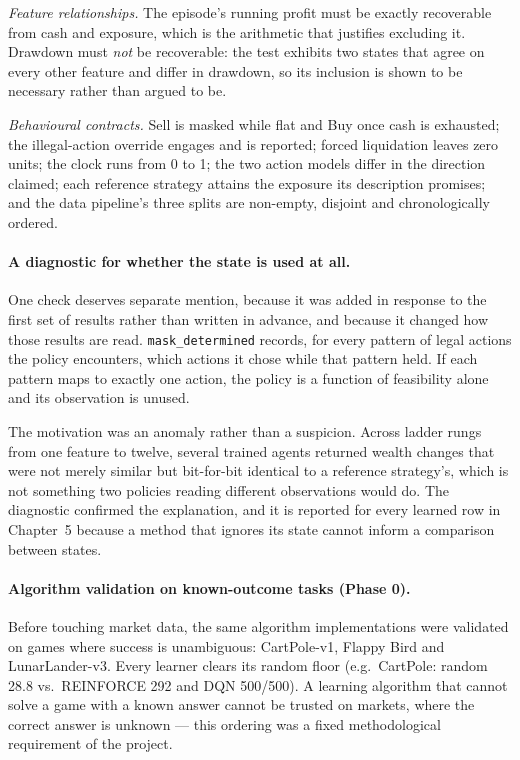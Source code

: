 \emph{Feature relationships.} The episode's running profit must be exactly
recoverable from cash and exposure, which is the arithmetic that justifies
excluding it. Drawdown must \emph{not} be recoverable: the test exhibits two
states that agree on every other feature and differ in drawdown, so its
inclusion is shown to be necessary rather than argued to be.

\emph{Behavioural contracts.} Sell is masked while flat and Buy once cash is
exhausted; the illegal-action override engages and is reported; forced
liquidation leaves zero units; the clock runs from 0 to 1; the two action
models differ in the direction claimed; each reference strategy attains the
exposure its description promises; and the data pipeline's three splits are
non-empty, disjoint and chronologically ordered.

\paragraph{A diagnostic for whether the state is used at all.} One check
deserves separate mention, because it was added in response to the first
set of results rather than written in advance, and because it changed how
those results are read. \texttt{mask\_determined} records, for every pattern
of legal actions the policy encounters, which actions it chose while that
pattern held. If each pattern maps to exactly one action, the policy is a
function of feasibility alone and its observation is unused.

The motivation was an anomaly rather than a suspicion. Across ladder rungs
from one feature to twelve, several trained agents returned wealth changes
that were not merely similar but bit-for-bit identical to a reference
strategy's, which is not something two policies reading different
observations would do. The diagnostic confirmed the explanation, and it is
reported for every learned row in Chapter~5 because a method that ignores
its state cannot inform a comparison between states.

\paragraph{Algorithm validation on known-outcome tasks (Phase 0).} Before
touching market data, the same algorithm implementations were validated on
games where success is unambiguous: CartPole-v1, Flappy Bird and
LunarLander-v3. Every learner clears its random floor (e.g.\ CartPole:
random 28.8 vs.\ REINFORCE 292 and DQN 500/500). A learning algorithm that
cannot solve a game with a known answer cannot be trusted on markets,
where the correct answer is unknown --- this ordering was a fixed
methodological requirement of the project.

